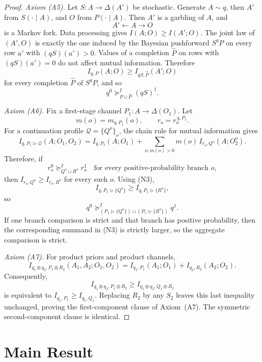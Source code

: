 \documentclass[11pt,a4paper]{article}
\theoremstyle{definition}
\newcommand{\1}{\mathbf 1}
\begin{document}
\begin{proof}
\emph{Axiom \textup{(A5)}.}
Let $S:A\to\Delta(A')$ be stochastic.  Generate $A\sim q$, then $A'$ from $S(\cdot\mid A)$, and $O$ from
$P(\cdot\mid A)$.  Then $A'$ is a garbling of $A$, and
\[
A'\longleftarrow A\longrightarrow O
\]
is a Markov fork.  Data processing gives $I(A;O)\ge I(A';O)$.  The joint law of $(A',O)$ is exactly the one induced by the
Bayesian pushforward $S^qP$ on every row $a'$ with $(qS)(a')>0$.  Values of a completion $\widehat P$ on rows with
$(qS)(a')=0$ do not affect mutual information.  Therefore
\[
I_{q,P}(A;O)\ge I_{qS,\widehat P}(A';O)
\]
for every completion $\widehat P$ of $S^qP$, and so
\[
q^0\succeq^I_{P\sqcup\widehat P}(qS)^1.
\]

\emph{Axiom \textup{(A6)}.}
Fix a first-stage channel $P_1:A\to\Delta(O_1)$.  Let
\[
m(o)=m_{q,P_1}(o),
\qquad
r_o=r_o^{\,q,P_1}.
\]
For a continuation profile $\mathcal Q=\{Q^o\}_o$, the chain rule for mutual information gives
\[
I_{q,P_1\triangleright\mathcal Q}(A;O_1,O_2)
=
I_{q,P_1}(A;O_1)
+
\sum_{o:m(o)>0}m(o)\,I_{r_o,Q^o}(A;O_2^o).
\tag{N3}
\]
Therefore, if
\[
r_o^0\succeq^I_{Q^o\sqcup R^o}r_o^1
\quad\text{for every positive-probability branch }o,
\]
then $I_{r_o,Q^o}\ge I_{r_o,R^o}$ for every such $o$.  Using (N3),
\[
I_{q,P_1\triangleright\{Q^o\}}
\ge
I_{q,P_1\triangleright\{R^o\}},
\]
so
\[
q^0
\succeq^I_{(P_1\triangleright\{Q^o\})\sqcup(P_1\triangleright\{R^o\})}
q^1.
\]
If one branch comparison is strict and that branch has positive probability, then the corresponding summand in (N3) is
strictly larger, so the aggregate comparison is strict.

\emph{Axiom \textup{(A7)}.}
For product priors and product channels,
\[
I_{q_1\otimes q_2,P_1\otimes R_2}(A_1,A_2;O_1,O_2)
=
I_{q_1,P_1}(A_1;O_1)+I_{q_2,R_2}(A_2;O_2).
\tag{N4}
\]
Consequently,
\[
I_{q_1\otimes q_2,P_1\otimes R_2}
\ge
I_{q_1\otimes q_2,Q_1\otimes R_2}
\]
is equivalent to $I_{q_1,P_1}\ge I_{q_1,Q_1}$.  Replacing $R_2$ by any $S_2$ leaves this last inequality unchanged, proving
the first-component clause of Axiom~\textup{(A7)}.  The symmetric second-component clause is identical.
\end{proof}

\section*{Main Result}
\end{document}
